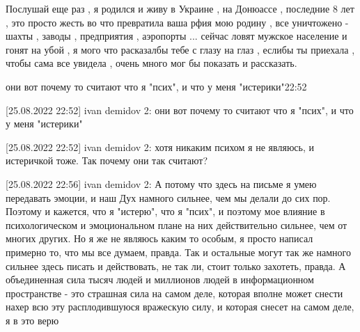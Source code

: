 Послушай еще раз , я родился и живу в Украине , на Донюассе , последние 8 лет ,
это просто жесть во что превратила ваша рфия мою родину , все уничтожено -
шахты , заводы , предприятия , аэропорты ... сейчас ловят мужское население и
гонят на убой , я мого что расказалбы тебе с глазу на глаз , еслибы ты приехала
, чтобы сама все увидела , очень много мог бы показать и рассказать.

они вот почему то считают что я "псих", и что у меня "истерики"22:52

[25.08.2022 22:52] ivan demidov 2: они вот почему то считают что я "псих", и
что у меня "истерики"

[25.08.2022 22:52] ivan demidov 2: хотя никаким психом я не являюсь, и
истеричкой тоже. Так почему они так считают?

[25.08.2022 22:56] ivan demidov 2: А потому что здесь на письме я умею
передавать эмоции, и наш Дух намного сильнее, чем мы делали до сих пор. Поэтому
и кажется, что я "истерю", что я "псих", и поэтому мое влияние в
психологическом и эмоциональном плане на них действительно сильнее, чем от
многих других. Но я же не являюсь каким то особым, я просто написал примерно
то, что мы все думаем, правда. Так и остальные могут так же намного сильнее
здесь писать и действовать, не так ли, стоит только захотеть, правда. А
объединенная сила тысяч людей и миллионов людей в информационном пространстве -
это страшная сила на самом деле, которая вполне может снести нахер всю эту
расплодившуюся вражескую силу, и которая снесет на самом деле, я в это верю


